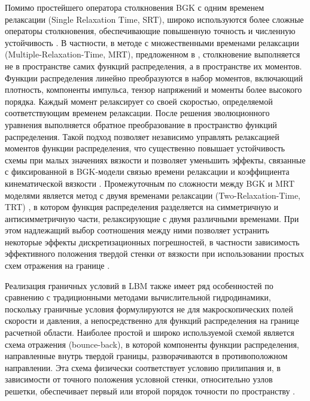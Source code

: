 \documentclass[12pt,a4paper]{article}
\begin{document}
Помимо простейшего оператора столкновения BGK с одним временем релаксации (Single Relaxation Time, SRT), широко используются более сложные операторы столкновения, обеспечивающие повышенную точность и численную устойчивость \cite{Krger2017, Succi2018}. В частности, в методе с множественными временами релаксации (Multiple-Relaxation-Time, MRT), предложенном в \cite{dHumires2002}, столкновение выполняется не в пространстве самих функций распределения, а в пространстве их моментов. Функции распределения линейно преобразуются в набор моментов, включающий плотность, компоненты импульса, тензор напряжений и моменты более высокого порядка. Каждый момент релаксирует со своей скоростью, определяемой соответствующим временем релаксации. После решения эволюционного уравнения выполняется обратное преобразование в пространство функций распределения. Такой подход позволяет независимо управлять релаксацией моментов функции распределения, что существенно повышает устойчивость схемы при малых значениях вязкости и позволяет уменьшить эффекты, связанные с фиксированной в BGK-модели связью времени релаксации и коэффициента кинематической вязкости \cite{dHumires2002, Krger2017, Succi2018}.
Промежуточным по сложности между BGK и MRT моделями является метод с двумя временами релаксации (Two-Relaxation-Time, TRT) \cite{Ginzburg2003, Ginzburg2005, Ginzburg2008}, в котором функция распределения разделяется на симметричную и антисимметричную части, релаксирующие с двумя различными временами. При этом надлежащий выбор соотношения между ними
позволяет устранить некоторые эффекты дискретизационных погрешностей, в частности зависимость эффективного положения твердой стенки от вязкости при использовании простых схем отражения на границе \cite{Ginzburg2008, Krger2017}.

Реализация граничных условий в LBM также имеет ряд особенностей по сравнению с традиционными методами вычислительной гидродинамики, поскольку граничные условия формулируются не для макроскопических полей скорости и давления, а непосредственно для функций распределения на границе расчетной области. Наиболее простой и широко используемой схемой является схема отражения (bounce-back), в которой компоненты функции распределения, направленные внутрь твердой границы, разворачиваются в противоположном направлении. Эта схема физически соответствует условию прилипания и, в зависимости от точного положения условной стенки, относительно узлов решетки, обеспечивает первый или второй порядок точности по пространству \cite{Krger2017, Succi2018}.
\end{document}
